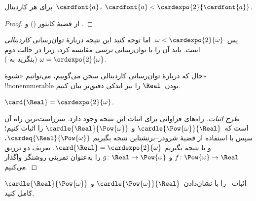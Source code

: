 \documentclass[../../../include/open-logic-section]{subfiles}
\begin{document}
\begin{cor}
برای هر کاردینال~$\cardfont{a}$،
$\cardfont{a}<\cardexpo{2}{\cardfont{a}}$.
\end{cor}

\begin{proof}
از قضیهٔ کانتور () و
.
\end{proof}
\noindent
پس~$\omega<\cardexpo{2}{\omega}$. اما توجه کنید این نتیجه دربارهٔ
توان‌رسانی \emph{کاردینالی} است. باید آن را با توان‌رسانی
\emph{ترتیبی} مقایسه کرد، زیرا در حالت دوم
$\omega=\ordexpo{2}{\omega}$ (بنگرید به
).

حال که دربارهٔ توان‌رسانی کاردینالی سخن می‌گوییم، می‌توانیم «شیوهٔ»
!!{nonenumerable} بودن~$\Real$ را نیز اندکی دقیق‌تر بیان کنیم.

\begin{thm}
$\card{\Real}=\cardexpo{2}{\omega}$.
\end{thm}

\begin{proof}[طرح اثبات]
راه‌های فراوانی برای اثبات این نتیجه وجود دارد. سرراست‌ترین راه آن است
که~$\cardle{\Pow{\omega}}{\Real}$ و
$\cardle{\Real}{\Pow{\omega}}$ را اثبات کنیم؛ سپس با استفاده از قضیهٔ
شرودر--برنشتاین نتیجه بگیریم
$\cardeq{\Real}{\Pow{\omega}}$، و با
 نتیجه بگیریم
$\card{\Real}=\cardexpo{2}{\omega}$. تعریف دو تزریق
$f\colon\Pow{\omega}\to\Real$ و
$g\colon\Real\to\Pow{\omega}$ را به‌عنوان تمرینی روشنگر واگذار می‌کنیم.
\end{proof}

\begin{prob}
اثبات~ را با
نشان‌دادن~$\cardle{\Pow{\omega}}{\Real}$ و
$\cardle{\Real}{\Pow{\omega}}$ کامل کنید.
\end{prob}
\end{document}
